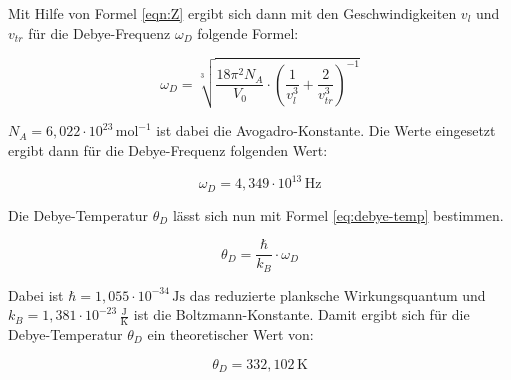 Mit Hilfe von Formel \eqref{eqn:Z} ergibt sich dann mit den Geschwindigkeiten $v_l$ und $v_{tr}$ für die Debye-Frequenz $\omega_D$ folgende Formel:

\begin{equation}
    \omega_D = \sqrt[3]{\frac{18 \pi^2 N_A}{V_0} \cdot \left( \frac{1}{v_l^3} + \frac{2}{v_{tr}^3} \right)^{-1} }
    \label{eq:omega}
\end{equation}

$N_A = 6, \! 022 \cdot 10^ {23} \, \mathrm{mol}^{-1}$ ist dabei die Avogadro-Konstante. Die Werte eingesetzt ergibt dann für die Debye-Frequenz folgenden Wert:

\begin{equation*}
    \omega_D = 4, \! 349 \cdot 10^{13} \, \mathrm{Hz}
\end{equation*}

Die Debye-Temperatur $\theta_D$ lässt sich nun mit Formel \eqref{eq:debye-temp} bestimmen.

\begin{equation}
    \theta_D = \frac{\hbar}{k_B} \cdot \omega_D
    \label{eq:debye-temp}
\end{equation}

Dabei ist $\hbar = 1, \! 055 \cdot 10^{-34} \, \mathrm{Js}$ \cite{h_quer} das reduzierte planksche Wirkungsquantum und $k_B = 1, \! 381 \cdot 10^{-23} \, \frac{\mathrm{J}}{\mathrm{K}}$ \cite{k_B} ist die Boltzmann-Konstante. Damit ergibt sich für die Debye-Temperatur $\theta_D$ ein theoretischer Wert von:

\begin{equation*}
    \theta_D = 332, \! 102 \, \mathrm{K}
\end{equation*}
